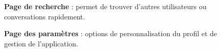 \documentclass[12pt]{report}
\begin{document}
\begin{figure}[H]
\begin{minipage}[t]{0.45\textwidth}
			\caption*{\textbf{Page de recherche} : permet de trouver d’autres utilisateurs ou conversations rapidement.}
		\end{minipage}
		\hfill
		\begin{minipage}[t]{0.45\textwidth}
			\centering
			\caption*{\textbf{Page des paramètres} : options de personnalisation du profil et de gestion de l’application.}
		\end{minipage}
	\end{figure}
	
\end{document}
